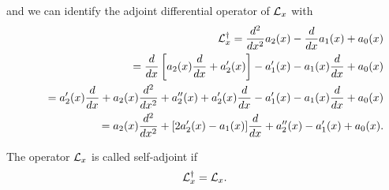 and we can identify the adjoint differential operator of ${\cal L}_x$ with
\begin{equation}
\begin{split}
{\cal L}_x^\dagger
=\frac{d^2}{dx^2}  a_2(x)  - \frac{d }{dx } a_1(x)    + a_0(x) \\
\qquad =
\frac{d}{dx} \left[ a_2(x) \frac{d}{dx} + a'_2(x)\right]  - a'_1(x) - a_1(x)\frac{d }{dx }    + a_0(x) \\
\qquad =
 a'_2(x) \frac{d}{dx} + a_2(x) \frac{d^2}{dx^2} + a''_2(x) + a'_2(x)\frac{d}{dx}
  - a'_1(x) - a_1(x)\frac{d }{dx }    + a_0(x)  \\
\qquad =
 a_2(x) \frac{d^2}{dx^2}
+
[2 a'_2(x)- a_1(x) ]  \frac{d}{dx}
+ a''_2(x)   - a'_1(x)   + a_0(x)
.
\end{split}
\label{2011-m-ch-slspbtfaob}
\end{equation}

The operator ${\cal L}_x$ is called self-adjoint if
\begin{equation}
{\cal L}_x^\dagger
=  {\cal L}_x .
\label{2011-m-ch-slspbtfaob1}
\end{equation}



